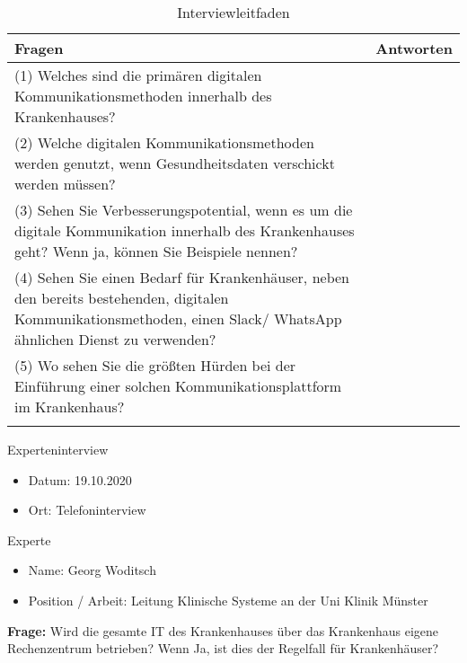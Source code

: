 \begin{longtable}{p{12cm}|p{3cm}}
  \textbf{Fragen}                                                                                                                                           &   \textbf{Antworten}   \\ \hline
(1) Welches sind die primären digitalen Kommunikationsmethoden innerhalb des Krankenhauses?  &     \\ \hline
(2)	Welche digitalen Kommunikationsmethoden werden genutzt, wenn Gesundheitsdaten verschickt werden müssen?                                       &          \\ \hline
(3)	Sehen Sie Verbesserungspotential, wenn es um die digitale Kommunikation innerhalb des Krankenhauses geht? Wenn ja, können Sie Beispiele nennen?                                                            &       \\ \hline
(4)	Sehen Sie einen Bedarf für Krankenhäuser, neben den bereits bestehenden, digitalen Kommunikationsmethoden, einen Slack/ WhatsApp ähnlichen Dienst zu verwenden?                                                          &       \\ \hline
(5)	Wo sehen Sie die größten Hürden bei der Einführung einer solchen Kommunikationsplattform im Krankenhaus?                &          \\ \hline
\caption{Interviewleitfaden} 
\end{longtable}


Experteninterview
\begin{itemize}
  \item Datum: 19.10.2020
  \item Ort: Telefoninterview
\end{itemize}

Experte
\begin{itemize}
  \item Name: Georg Woditsch 
  \item Position / Arbeit: Leitung Klinische Systeme an der Uni Klinik Münster
\end{itemize}

\textbf{Frage: }Wird die gesamte IT des Krankenhauses über das Krankenhaus eigene Rechenzentrum betrieben?  Wenn Ja, ist dies der Regelfall für Krankenhäuser?

